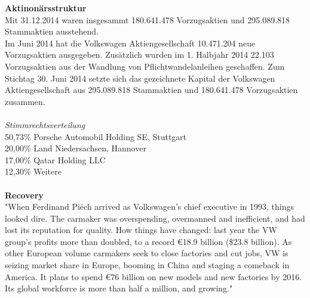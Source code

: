 \documentclass[12pt]{article}
\begin{document}
\noindent
\textbf{Aktinonärsstruktur}\\
Mit 31.12.2014 waren insgesammt 180.641.478 Vorzugsaktien und 295.089.818 Stammaktien ausstehend.\\
Im Juni 2014 hat die Volkswagen Aktiengesellschaft 10.471.204 neue Vorzugsaktien ausgegeben. Zusätzlich wurden im 1. Halbjahr 2014 22.103 Vorzugsaktien aus der Wandlung von Pflichtwandelanleihen geschaffen. Zum Stichtag 30. Juni 2014 setzte sich das gezeichnete Kapital der Volkswagen Aktiengesellschaft aus 295.089.818 Stammaktien und 180.641.478 Vorzugsaktien zusammen.
\cite{aktionaersstruktur} \\ \\
\textit{Stimmrechtsverteilung} \\
50,73\% Porsche Automobil Holding SE, Stuttgart\\
20,00\% Land Niedersachsen, Hannover\\
17,00\% Qatar Holding LLC\\
12,30\% Weitere
\\ \\
\textbf{Recovery}\\
"When Ferdinand Piëch arrived as Volkswagen's chief executive in 1993, things looked dire. The carmaker was overspending, overmanned and inefficient, and had lost its reputation for quality. How things have changed: last year the VW group's profits more than doubled, to a record €18.9 billion (\$23.8 billion). As other European volume carmakers seek to close factories and cut jobs, VW is seizing market share in Europe, booming in China and staging a comeback in America. It plans to spend €76 billion on new models and new factories by 2016. Its global workforce is more than half a million, and growing."\cite{ec2}
\\ \\
\end{document}
